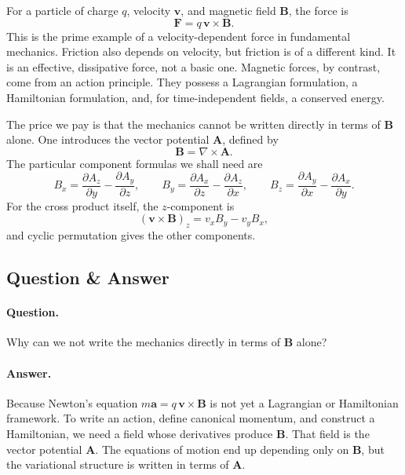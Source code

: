 For a particle of charge \(q\), velocity \(\mathbf v\), and magnetic field \(\mathbf B\), the force is
\begin{equation}
\mathbf F=q\,\mathbf v\times \mathbf B.
\end{equation}
This is the prime example of a velocity-dependent force in fundamental mechanics. Friction also depends on velocity, but friction is of a different kind. It is an effective, dissipative force, not a basic one. Magnetic forces, by contrast, come from an action principle. They possess a Lagrangian formulation, a Hamiltonian formulation, and, for time-independent fields, a conserved energy.

The price we pay is that the mechanics cannot be written directly in terms of \(\mathbf B\) alone. One introduces the vector potential \(\mathbf A\), defined by
\begin{equation}
\mathbf B=\nabla\times \mathbf A.
\end{equation}
The particular component formulas we shall need are
\begin{equation}
B_x=\frac{\partial A_z}{\partial y}-\frac{\partial A_y}{\partial z},
\qquad
B_y=\frac{\partial A_x}{\partial z}-\frac{\partial A_z}{\partial x},
\qquad
B_z=\frac{\partial A_y}{\partial x}-\frac{\partial A_x}{\partial y}.
\end{equation}
For the cross product itself, the \(z\)-component is
\begin{equation}
(\mathbf v\times \mathbf B)_z=v_xB_y-v_yB_x,
\end{equation}
and cyclic permutation gives the other components.

\subsection{Question \& Answer}

\paragraph{Question.} Why can we not write the mechanics directly in terms of \(\mathbf B\) alone?

\paragraph{Answer.} Because Newton's equation \(m\mathbf a=q\,\mathbf v\times\mathbf B\) is not yet a Lagrangian or Hamiltonian framework. To write an action, define canonical momentum, and construct a Hamiltonian, we need a field whose derivatives produce \(\mathbf B\). That field is the vector potential \(\mathbf A\). The equations of motion end up depending only on \(\mathbf B\), but the variational structure is written in terms of \(\mathbf A\).

